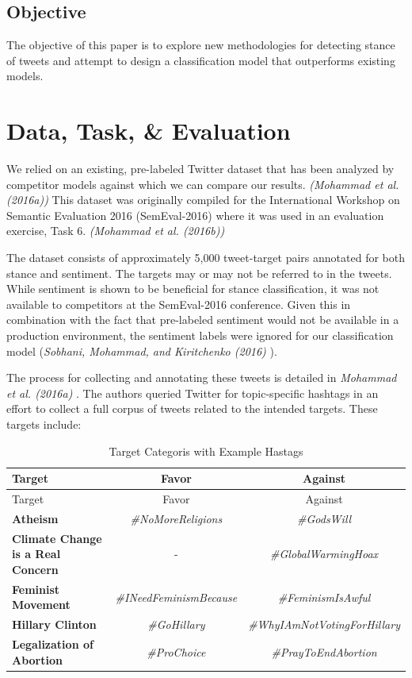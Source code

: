 \documentclass[]{article}
\begin{document}
\hypertarget{objective}{%
\subsection{Objective}\label{objective}}

The objective of this paper is to explore new methodologies for
detecting stance of tweets and attempt to design a classification model
that outperforms existing models.

\hypertarget{data-task-evaluation}{%
\section{Data, Task, \& Evaluation}\label{data-task-evaluation}}

We relied on an existing, pre-labeled Twitter dataset that has been
analyzed by competitor models against which we can compare our results.
\emph{(Mohammad et al. (2016a))} This dataset was originally compiled
for the International Workshop on Semantic Evaluation 2016
(SemEval-2016) where it was used in an evaluation exercise, Task 6.
\emph{(Mohammad et al. (2016b))}

The dataset consists of approximately 5,000 tweet-target pairs annotated
for both stance and sentiment. The targets may or may not be referred to
in the tweets. While sentiment is shown to be beneficial for stance
classification, it was not available to competitors at the SemEval-2016
conference. Given this in combination with the fact that pre-labeled
sentiment would not be available in a production environment, the
sentiment labels were ignored for our classification model
(\emph{Sobhani, Mohammad, and Kiritchenko (2016) }).

The process for collecting and annotating these tweets is detailed in
\emph{Mohammad et al. (2016a) }. The authors queried Twitter for
topic-specific hashtags in an effort to collect a full corpus of tweets
related to the intended targets. These targets include:

\begin{longtable}[]{@{}lcc@{}}
\caption{Target Categoris with Example Hastags}\tabularnewline
\toprule
Target & Favor & Against\tabularnewline
\midrule
\endfirsthead
\toprule
Target & Favor & Against\tabularnewline
\midrule
\endhead
\textbf{Atheism} & \emph{\#NoMoreReligions} &
\emph{\#GodsWill}\tabularnewline
\textbf{Climate Change is a Real Concern} & - &
\emph{\#GlobalWarmingHoax}\tabularnewline
\textbf{Feminist Movement} & \emph{\#INeedFeminismBecause} &
\emph{\#FeminismIsAwful}\tabularnewline
\textbf{Hillary Clinton} & \emph{\#GoHillary} &
\emph{\#WhyIAmNotVotingForHillary}\tabularnewline
\textbf{Legalization of Abortion} & \emph{\#ProChoice} &
\emph{\#PrayToEndAbortion}\tabularnewline
\bottomrule
\end{longtable}
\end{document}
